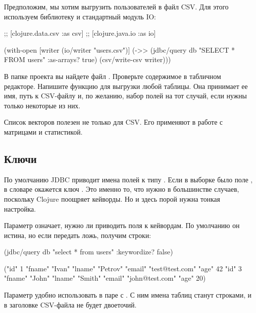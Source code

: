 
Предположим, мы хотим выгрузить пользователей в файл CSV. Для этого используем библиотеку  и стандартный модуль IO:

\begin{english}
  \begin{clojure}
;; [clojure.data.csv :as csv]
;; [clojure.java.io :as io]

(with-open [writer (io/writer "users.csv")]
  (->> (jdbc/query db
                   "SELECT * FROM users"
                   {:as-arrays? true})
       (csv/write-csv writer)))
  \end{clojure}
\end{english}

В папке проекта вы найдете файл . Проверьте содержимое в табличном редакторе. Напишите функцию для выгрузки любой таблицы. Она принимает ее имя, путь к CSV-файлу и, по желанию, набор полей на тот случай, если нужны только некоторые из них.

Список векторов полезен не только для CSV. Его применяют в работе с матрицами и статистикой.

\subsection{Ключи}


По умолчанию JDBC приводит имена полей к типу . Если в выборке было поле , в словаре окажется ключ . Это именно то, что нужно в большинстве случаев, поскольку Clojure поощряет кейворды. Но и здесь порой нужна тонкая настройка.

Параметр  означает, нужно ли приводить поля к кейвордам. По умолчанию он истина, но если передать ложь, получим строки:

\begin{english}
  \begin{clojure}
(jdbc/query db "select * from users"
               {:keywordize? false})

({"id" 1
  "fname" "Ivan"
  "lname" "Petrov"
  "email" "test@test.com"
  "age" 42}
 {"id" 3
  "fname" "John"
  "lname" "Smith"
  "email" "john@test.com"
  "age" 20})
  \end{clojure}
\end{english}

Параметр удобно использовать в паре с . С ним имена таблиц станут строками, и в заголовке CSV-файла не будет двоеточий.

